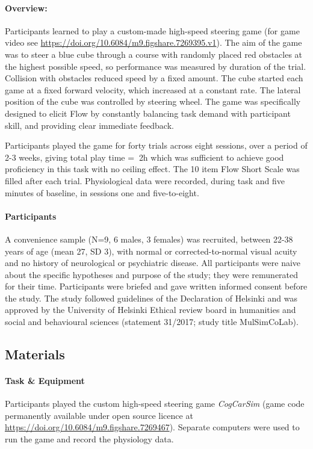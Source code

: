 \documentclass[10pt,letterpaper,floatsintext]{article}
\begin{document}
\paragraph{Overview:}
Participants learned to play a custom-made high-speed steering game (for game video see \url{https://doi.org/10.6084/m9.figshare.7269395.v1}). The aim of the game was to steer a blue cube through a course with randomly placed red obstacles at the highest possible speed, so performance was measured by duration of the trial. Collision with obstacles reduced speed by a fixed amount. The cube started each game at a fixed forward velocity, which increased at a constant rate. The lateral position of the cube was controlled by steering wheel. The game was specifically designed to elicit Flow by constantly balancing task demand with participant skill, and providing clear immediate feedback.

Participants played the game for forty trials across eight sessions, over a period of 2-3 weeks, giving total play time = $~$2h which was sufficient to achieve good proficiency in this task with no ceiling effect. The 10 item Flow Short Scale \cite{Engeser2008} was filled after each trial. Physiological data were recorded, during task and five minutes of baseline, in sessions one and five-to-eight.


\paragraph{Participants}
A convenience sample (N=9, 6 males, 3 females) was recruited, between 22-38 years of age (mean 27, SD 3), with normal or corrected-to-normal visual acuity and no history of neurological or psychiatric disease. All participants were naive about the specific hypotheses and purpose of the study; they were remunerated for their time. Participants were briefed and gave written informed consent before the study. The study followed guidelines of the Declaration of Helsinki and was approved by the University of Helsinki Ethical review board in humanities and social and behavioural sciences (statement 31/2017; study title MulSimCoLab).

\subsection*{Materials}
\paragraph{Task \& Equipment} Participants played the custom high-speed steering game {\it CogCarSim} (game code permanently available under open source licence at \url{https://doi.org/10.6084/m9.figshare.7269467}). Separate computers were used to run the game and record the physiology data.
\end{document}
